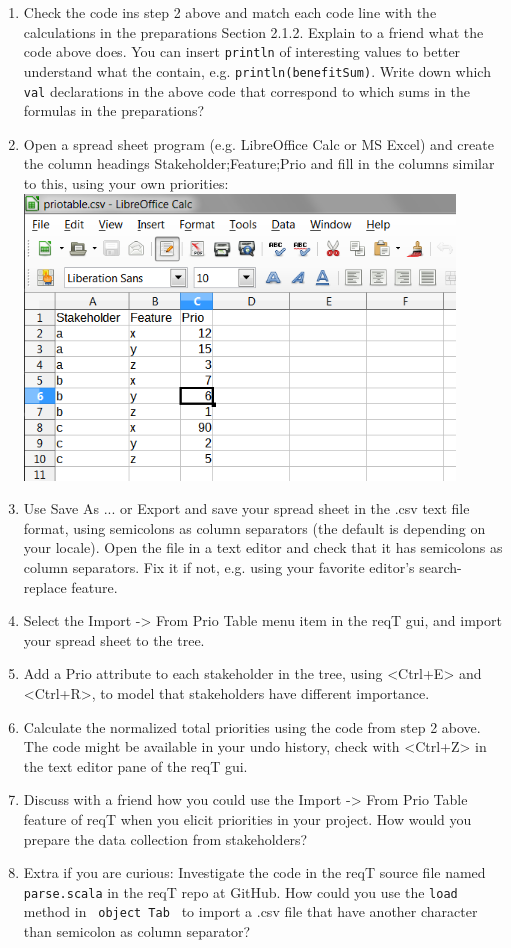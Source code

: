 \documentclass[11pt]{article}
\begin{document}
\begin{framed}
\begin{enumerate}
\vspace{1em}
\item Check the code ins step 2 above and match each code line with the calculations in the preparations Section 2.1.2. Explain to a friend what the code above does. You can insert \verb+println+ of interesting values to better understand what the contain, e.g. \verb+println(benefitSum)+. Write down which {\verb+val+} declarations in the above code that correspond to which sums in the formulas in the preparations? 
\vspace{6em}
\item Open a spread sheet program (e.g. LibreOffice Calc or MS Excel) and create the column headings Stakeholder;Feature;Prio and fill in the columns similar to this, using your own priorities:
\includegraphics[width=0.9\textwidth]{spread-sheet.png}
\item Use Save As ... or Export and save your spread sheet in the .csv text file format, using semicolons as column separators (the default is depending on your locale). Open the file in a text editor and check that it has semicolons as column separators. Fix it if not, e.g. using your favorite editor's search-replace feature.
\item Select the Import -> From Prio Table menu item in the reqT gui, and import your spread sheet to the tree.
\item Add a Prio attribute to each stakeholder in the tree, using <Ctrl+E> and <Ctrl+R>, to model that stakeholders have different importance.
\item Calculate the normalized total priorities using the code from step 2 above. The code might be available in your undo history, check with <Ctrl+Z> in the text editor pane of the reqT gui.
\item Discuss with a friend how you could use the Import -> From Prio Table feature of reqT when you elicit priorities in your project. How would you prepare the data collection from stakeholders?
\item Extra if you are curious: Investigate the code in the reqT source file named \verb+parse.scala+ in the reqT repo at GitHub. How could you use the \verb+load+ method in \verb+ object Tab + to import a .csv file that have another character than semicolon as column separator? 
\end{enumerate}

\end{framed}
\end{document}
